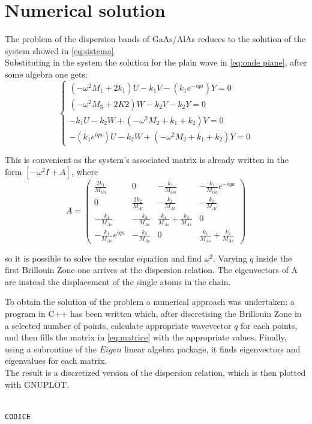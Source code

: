 \documentclass{article}
\begin{document}
\section{Numerical solution}
The problem of the dispersion bands of GaAs/AlAs reduces to the solution of the system showed in \autoref{eq:sistema}. \\
Substituting in the system the solution for the plain wave in \autoref{eq:onde piane}, after some algebra one gets:
\begin{equation}
	\begin{cases}
	(-\omega^2M_1 + 2k_1)U - k_1V - (k_1e^{-iqa})Y = 0 \\
    (-\omega^2M_3 + 2K2)W -k_2V - k_2Y = 0 \\
	-k_1U -k_2W + (-\omega^2M_2 + k_1 + k_2)V = 0 \\
	-(k_1e^{iqa})U - k_2W + (-\omega^2M_2 + k_1 + k_2)Y = 0	
	\end{cases}
	\label{sist.final}
\end {equation}

This is convenient as the system's associated matrix is already written in the form $[-\omega^2I + A]$, where
\begin{equation} 
A = \begin{pmatrix}
   \frac{2k_1}{M_{Ga}}	& 0  & -\frac{k_1}{M_{Ga}}  & -\frac{k_1}{M_{Ga}}e^{-iqa}  \\ 
   0	& \frac{2k_2}{M_{Al}}  & -\frac{k_2}{M_{Al}}  & -\frac{k_2}{M_{Al}}  \\ 
   -\frac{k_1}{M_{As}} 	& -\frac{k_2}{M_{As}}   & \frac{k_1}{M_{As}}+\frac{k_2}{M_{As}}   & 0  \\ 
   -\frac{k_1}{M_{As}}e^{iqa} 	& -\frac{k_2}{M_{As}}  & 0  & \frac{k_1}{M_{As}}+\frac{k_2}{M_{As}}   
\end{pmatrix} 
\label{eq:matrice}
\end{equation}


so it is possible to solve the secular equation and find $\omega^2$. Varying $q$ inside the first Brillouin Zone one arrives at the dispersion relation. The eigenvectors of A are instead the displacement of the single atoms in the chain.\par
\medskip

To obtain the solution of the problem a numerical approach was undertaken: a program in C++ has been written which, after discretising the Brillouin Zone in a selected number of points, calculate appropriate wavevector $q$ for each points, and then fills the matrix in \autoref{eq:matrice} with the appropriate values. Finally, using a subroutine of the $Eigen$ linear algebra package, it finds eigenvectors and eigenvalues for each matrix.\\
The result is a discretized version of the dispersion relation, which is then plotted with GNUPLOT.

\begin{lstlisting}[language=C++, caption={Subroutine norma \\ \emph{maodulo.f90}}]

CODICE

\end{lstlisting} 


	
\end{document}
